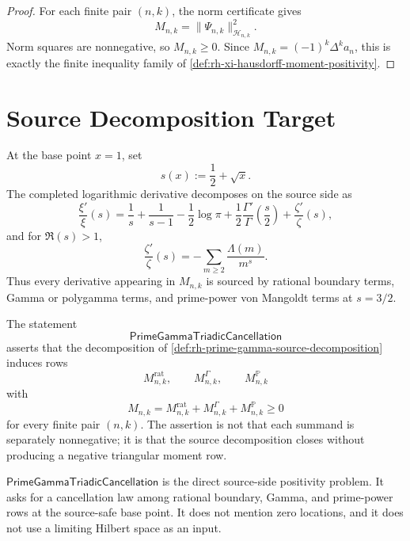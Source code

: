 \begin{proof}
For each finite pair $(n,k)$, the norm certificate gives
$$
M_{n,k}
=
\|\Psi_{n,k}\|_{\mathcal H_{n,k}}^2.
$$
Norm squares are nonnegative, so $M_{n,k}\ge0$. Since
$M_{n,k}=(-1)^k\Delta^k a_n$, this is exactly the finite inequality
family of \autoref{def:rh-xi-hausdorff-moment-positivity}.
\end{proof}

\section{Source Decomposition Target}
\label{sec:rh-final-source-decomposition-target}

\begin{definition}
\label{def:rh-prime-gamma-source-decomposition}
At the base point $x=1$, set
$$
s(x):=\frac12+\sqrt{x}.
$$
The completed logarithmic derivative decomposes on the source side as
$$
\frac{\xi'}{\xi}(s)
=
\frac1s+\frac1{s-1}
-\frac12\log\pi
+\frac12\frac{\Gamma'}{\Gamma}\left(\frac{s}{2}\right)
+\frac{\zeta'}{\zeta}(s),
$$
and for $\Re(s)>1$,
$$
\frac{\zeta'}{\zeta}(s)
=
-\sum_{m\ge2}
\frac{\Lambda(m)}{m^s}.
$$
Thus every derivative appearing in $M_{n,k}$ is sourced by rational
boundary terms, Gamma or polygamma terms, and prime-power von Mangoldt
terms at $s=3/2$.
\end{definition}

\begin{definition}
\label{def:rh-prime-gamma-triadic-cancellation}
The statement
$$
\mathsf{PrimeGammaTriadicCancellation}
$$
asserts that the decomposition of
\autoref{def:rh-prime-gamma-source-decomposition} induces rows
$$
M_{n,k}^{\mathrm{rat}},
\qquad
M_{n,k}^{\Gamma},
\qquad
M_{n,k}^{\mathbb P}
$$
with
$$
M_{n,k}
=
M_{n,k}^{\mathrm{rat}}
+
M_{n,k}^{\Gamma}
+
M_{n,k}^{\mathbb P}
\ge0
$$
for every finite pair $(n,k)$. The assertion is not that each summand is
separately nonnegative; it is that the source decomposition closes
without producing a negative triangular moment row.
\end{definition}

\begin{principle}
\label{prin:rh-prime-gamma-cancellation-source-side-form}
$\mathsf{PrimeGammaTriadicCancellation}$ is the direct source-side
positivity problem. It asks for a cancellation law among rational
boundary, Gamma, and prime-power rows at the source-safe base point. It
does not mention zero locations, and it does not use a limiting Hilbert
space as an input.
\end{principle}

